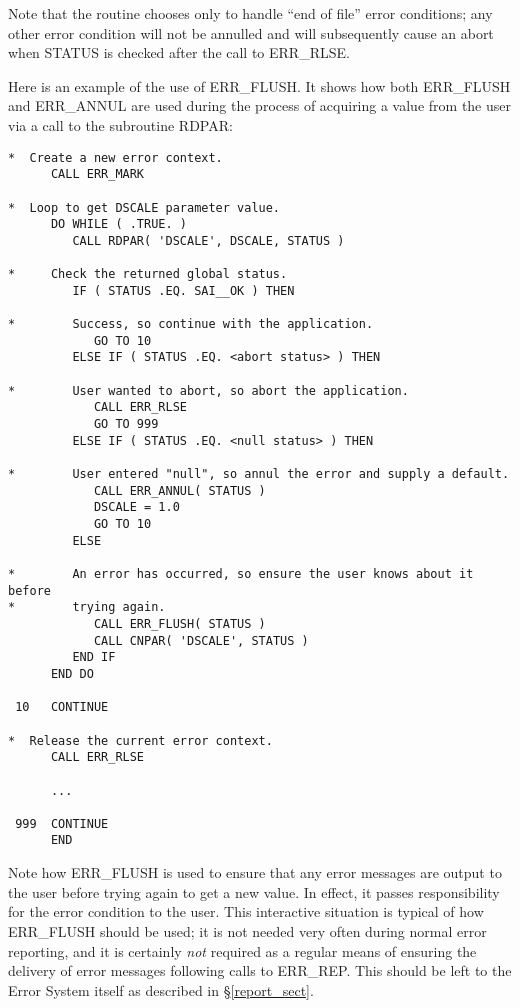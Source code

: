 Note that the routine chooses only to handle ``end of file'' error
conditions; any other error condition will not be annulled and will
subsequently cause an abort when STATUS is checked after the call to
ERR\_RLSE. 

Here is an example of the use of ERR\_FLUSH. 
It shows how both ERR\_FLUSH and ERR\_ANNUL are used during the process of
acquiring a value from the user via a call to the subroutine RDPAR: 

\begin {small}
\begin{verbatim}
*  Create a new error context.
      CALL ERR_MARK

*  Loop to get DSCALE parameter value.
      DO WHILE ( .TRUE. )
         CALL RDPAR( 'DSCALE', DSCALE, STATUS )

*     Check the returned global status.
         IF ( STATUS .EQ. SAI__OK ) THEN

*        Success, so continue with the application.
            GO TO 10
         ELSE IF ( STATUS .EQ. <abort status> ) THEN

*        User wanted to abort, so abort the application.
            CALL ERR_RLSE
            GO TO 999
         ELSE IF ( STATUS .EQ. <null status> ) THEN

*        User entered "null", so annul the error and supply a default.
            CALL ERR_ANNUL( STATUS )
            DSCALE = 1.0
            GO TO 10
         ELSE

*        An error has occurred, so ensure the user knows about it before
*        trying again.
            CALL ERR_FLUSH( STATUS )
            CALL CNPAR( 'DSCALE', STATUS )
         END IF
      END DO

 10   CONTINUE

*  Release the current error context.
      CALL ERR_RLSE

      ...

 999  CONTINUE
      END
\end{verbatim}
\end {small}

Note how ERR\_FLUSH is used to ensure that any error messages are output to
the user before trying again to get a new value. 
In effect, it passes responsibility for the error condition to the user.
This interactive situation is typical of how ERR\_FLUSH should 
be used; it is not needed very often during normal error reporting, and it 
is certainly {\em not} required as a regular means of ensuring the delivery
of error messages following calls to ERR\_REP.
This should be left to the Error System itself as described in
\S\ref{report_sect}. 

